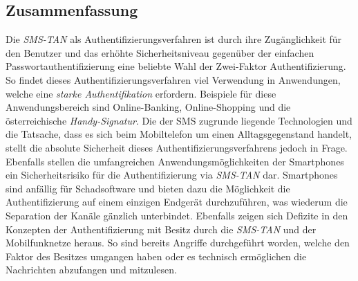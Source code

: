 \documentclass[11pt,a4paper,ngerman]{scrreprt}
\begin{document}
\subsection{Zusammenfassung}
Die \textit{SMS-TAN} als Authentifizierungsverfahren ist durch ihre Zugänglichkeit für den Benutzer und das erhöhte Sicherheitsniveau gegenüber der einfachen Passwortauthentifizierung eine beliebte Wahl der Zwei-Faktor Authentifizierung. So findet dieses Authentifizierungsverfahren viel Verwendung in Anwendungen, welche eine \emph{starke Authentifikation} erfordern. Beispiele für diese Anwendungsbereich sind Online-Banking, Online-Shopping und die österreichische \textit{Handy-Signatur}. Die der SMS zugrunde liegende Technologien und die Tatsache, dass es sich beim Mobiltelefon um einen Alltagsgegenstand handelt, stellt die absolute Sicherheit dieses Authentifizierungsverfahrens jedoch in Frage. Ebenfalls stellen die umfangreichen Anwendungsmöglichkeiten der Smartphones ein Sicherheitsrisiko für die Authentifizierung via \textit{SMS-TAN} dar. Smartphones sind anfällig für Schadsoftware und bieten dazu die Möglichkeit die Authentifizierung auf einem einzigen Endgerät durchzuführen, was wiederum die Separation der Kanäle gänzlich unterbindet. Ebenfalls zeigen sich Defizite in den Konzepten der Authentifizierung mit Besitz durch die \textit{SMS-TAN} und der Mobilfunknetze heraus. So sind bereits Angriffe durchgeführt worden, welche den Faktor des Besitzes umgangen haben oder es technisch ermöglichen die Nachrichten abzufangen und mitzulesen.
\end{document}
